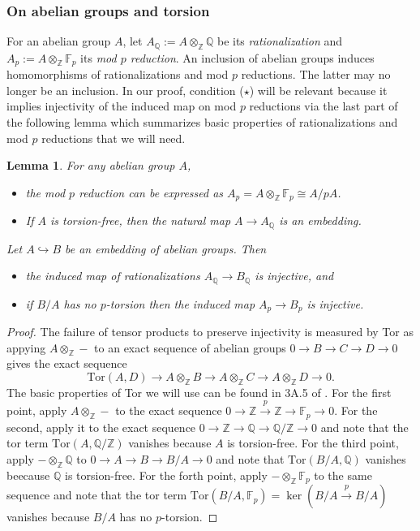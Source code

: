 \documentclass[11pt,letterpaper]{amsart}
\newtheorem{lemma}[theorem]{Lemma}
\begin{document}
\subsubsection*{On abelian groups and torsion}
For an abelian group $A$, let $A_{\mathbb Q}:=A\otimes_{\mathbb Z}\mathbb Q$ be its {\it rationalization} and $A_p:=A\otimes_{\mathbb Z}\mathbb F_p$ its {\it mod $p$ reduction}. An inclusion of abelian groups induces homomorphisms of rationalizations and mod $p$ reductions. The latter may no longer be an inclusion. In our proof, condition ($\star$) will be relevant because it implies injectivity of the induced map on mod $p$ reductions via the last part of the following lemma which summarizes basic properties of rationalizations and mod $p$ reductions that we will need. 
\begin{lemma}
\label{abgroup}
For any abelian group $A$, 
\begin{itemize}
\item[1.]
the mod $p$ reduction can be expressed as $A_p=A\otimes_{\mathbb Z}\mathbb F_p\cong A/pA$.
\item[2.]
If $A$ is torsion-free, then the natural map $A\rightarrow A_{\mathbb Q}$ is an embedding. 
\end{itemize} 
Let $A\hookrightarrow B$ be an embedding of abelian groups. Then
\begin{itemize}
\item[3.]
the induced map of rationalizations $A_{\mathbb Q}\rightarrow B_{\mathbb Q}$ is injective, and
\item[4.]
if $B/A$ has no $p$-torsion then the induced map $A_p\rightarrow B_p$ is injective. 
\end{itemize}
\end{lemma} 
\begin{proof}
The failure of tensor products to preserve injectivity is measured by Tor as appying $A\otimes_{\mathbb Z}-$ to an exact sequence of abelian groups $0\rightarrow B\rightarrow C\rightarrow D\rightarrow 0$ gives the exact sequence
$$
\mathrm{Tor}(A,D)\rightarrow A\otimes_{\mathbb Z}B\rightarrow A\otimes_{\mathbb Z}C\rightarrow A\otimes_{\mathbb Z}D\rightarrow 0.
$$ 
The basic properties of Tor we will use can be found in 3A.5 of \cite{hatcherbook}.
For the first point, apply $A\otimes_{\mathbb Z}-$ to the exact sequence $0\rightarrow\mathbb Z\stackrel p\rightarrow\mathbb Z\rightarrow\mathbb F_p\rightarrow 0$. For the second, apply it to the exact sequence $0\rightarrow\mathbb Z\rightarrow\mathbb Q\rightarrow\mathbb Q/\mathbb Z\rightarrow 0$ and note that the tor term $\mathrm{Tor}(A,\mathbb Q/\mathbb Z)$ vanishes because $A$ is torsion-free. For the third point, apply $-\otimes_{\mathbb Z}\mathbb Q$ to $0\rightarrow A\rightarrow B\rightarrow B/A\rightarrow 0$ and note that $\mathrm{Tor}(B/A,\mathbb Q)$ vanishes beecause $\mathbb Q$ is torsion-free. For the forth point, apply $-\otimes_{\mathbb Z}\mathbb F_p$ to the same sequence and note that the tor term $\mathrm{Tor}(B/A,\mathbb F_p)=\ker(B/A\stackrel{p}\rightarrow B/A)$ vanishes because $B/A$ has no $p$-torsion. 
\end{proof}
\end{document}
